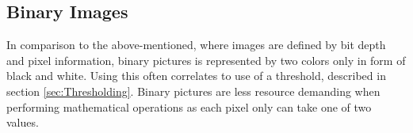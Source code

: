 \subsection{Binary Images}
In comparison to the above-mentioned, where images are defined by bit depth and pixel information, binary pictures is represented by two colors only in form of black and white. Using this often correlates to use of a threshold, described in section \ref{sec:Thresholding}. Binary pictures are less resource demanding when performing mathematical operations as each pixel only can take one of two values.\\



